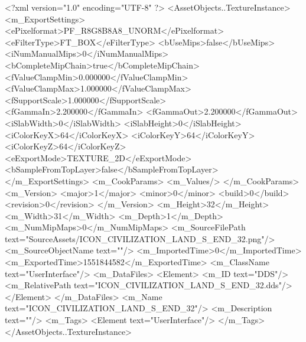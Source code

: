 <?xml version="1.0" encoding="UTF-8" ?>
<AssetObjects..TextureInstance>
	<m_ExportSettings>
		<ePixelformat>PF_R8G8B8A8_UNORM</ePixelformat>
		<eFilterType>FT_BOX</eFilterType>
		<bUseMips>false</bUseMips>
		<iNumManualMips>0</iNumManualMips>
		<bCompleteMipChain>true</bCompleteMipChain>
		<fValueClampMin>0.000000</fValueClampMin>
		<fValueClampMax>1.000000</fValueClampMax>
		<fSupportScale>1.000000</fSupportScale>
		<fGammaIn>2.200000</fGammaIn>
		<fGammaOut>2.200000</fGammaOut>
		<iSlabWidth>0</iSlabWidth>
		<iSlabHeight>0</iSlabHeight>
		<iColorKeyX>64</iColorKeyX>
		<iColorKeyY>64</iColorKeyY>
		<iColorKeyZ>64</iColorKeyZ>
		<eExportMode>TEXTURE_2D</eExportMode>
		<bSampleFromTopLayer>false</bSampleFromTopLayer>
	</m_ExportSettings>
	<m_CookParams>
		<m_Values/>
	</m_CookParams>
	<m_Version>
		<major>1</major>
		<minor>0</minor>
		<build>0</build>
		<revision>0</revision>
	</m_Version>
	<m_Height>32</m_Height>
	<m_Width>31</m_Width>
	<m_Depth>1</m_Depth>
	<m_NumMipMaps>0</m_NumMipMaps>
	<m_SourceFilePath text="SourceAssets/ICON_CIVILIZATION_LAND_S_END_32.png"/>
	<m_SourceObjectName text=""/>
	<m_ImportedTime>0</m_ImportedTime>
	<m_ExportedTime>1551844582</m_ExportedTime>
	<m_ClassName text="UserInterface"/>
	<m_DataFiles>
		<Element>
			<m_ID text="DDS"/>
			<m_RelativePath text="ICON_CIVILIZATION_LAND_S_END_32.dds"/>
		</Element>
	</m_DataFiles>
	<m_Name text="ICON_CIVILIZATION_LAND_S_END_32"/>
	<m_Description text=""/>
	<m_Tags>
		<Element text="UserInterface"/>
	</m_Tags>
</AssetObjects..TextureInstance>

